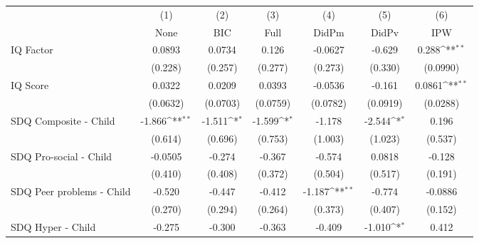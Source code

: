 {
\def\sym#1{\ifmmode^{#1}\else\(^{#1}\)\fi}
\begin{tabular}{l*{6}{c}}
\toprule
            &\multicolumn{1}{c}{(1)}&\multicolumn{1}{c}{(2)}&\multicolumn{1}{c}{(3)}&\multicolumn{1}{c}{(4)}&\multicolumn{1}{c}{(5)}&\multicolumn{1}{c}{(6)}\\
            &\multicolumn{1}{c}{None}&\multicolumn{1}{c}{BIC}&\multicolumn{1}{c}{Full}&\multicolumn{1}{c}{DidPm}&\multicolumn{1}{c}{DidPv}&\multicolumn{1}{c}{IPW}\\
\midrule
IQ Factor   &      0.0893         &      0.0734         &       0.126         &     -0.0627         &      -0.629         &       0.288\sym{**} \\
            &     (0.228)         &     (0.257)         &     (0.277)         &     (0.273)         &     (0.330)         &    (0.0990)         \\
\addlinespace
IQ Score    &      0.0322         &      0.0209         &      0.0393         &     -0.0536         &      -0.161         &      0.0861\sym{**} \\
            &    (0.0632)         &    (0.0703)         &    (0.0759)         &    (0.0782)         &    (0.0919)         &    (0.0288)         \\
\addlinespace
SDQ Composite - Child&      -1.866\sym{**} &      -1.511\sym{*}  &      -1.599\sym{*}  &      -1.178         &      -2.544\sym{*}  &       0.196         \\
            &     (0.614)         &     (0.696)         &     (0.753)         &     (1.003)         &     (1.023)         &     (0.537)         \\
\addlinespace
SDQ Pro-social - Child&     -0.0505         &      -0.274         &      -0.367         &      -0.574         &      0.0818         &      -0.128         \\
            &     (0.410)         &     (0.408)         &     (0.372)         &     (0.504)         &     (0.517)         &     (0.191)         \\
\addlinespace
SDQ Peer problems - Child&      -0.520         &      -0.447         &      -0.412         &      -1.187\sym{**} &      -0.774         &     -0.0886         \\
            &     (0.270)         &     (0.294)         &     (0.264)         &     (0.373)         &     (0.407)         &     (0.152)         \\
\addlinespace
SDQ Hyper - Child&      -0.275         &      -0.300         &      -0.363         &      -0.409         &      -1.010\sym{*}  &       0.412         \\

\end{tabular}}
